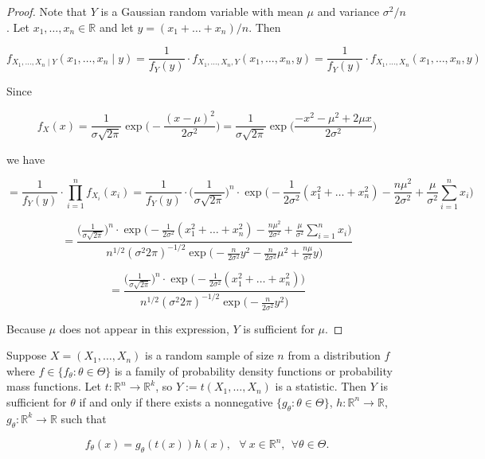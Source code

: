 \begin{proof} Note that \(Y\) is a Gaussian random variable with mean \(\mu\) and variance \(\sigma^2/n\). Let \(x_1, \ldots, x_n \in \mathbb{R}\) and let \(y = (x_1 + \ldots + x_n)/n\). Then

\[
f_{X_1, \ldots, X_n \mid Y}(x_1, \ldots, x_n \mid y) = \frac{1}{f_Y(y)} \cdot f_{X_1, \ldots , X_n, Y} (x_1, \ldots, x_n, y) = \frac{1}{f_Y(y)} \cdot f_{X_1, \ldots , X_n} (x_1, \ldots, x_n, y)
\]

Since

\[
f_X(x) = \frac{1}{\sigma \sqrt{2 \pi}} \exp \bigg(-\frac{ (x-\mu)^2}{2 \sigma^2} \bigg)  = \frac{1}{\sigma \sqrt{2 \pi}} \exp \bigg(\frac{ -x^2 - \mu^2 + 2 \mu x}{2 \sigma^2} \bigg) 
\]

we have

\[
= \frac{1}{f_Y(y)} \cdot \prod_{i=1}^n f_{X_i}(x_i) = \frac{1}{f_Y(y)} \cdot \bigg( \frac{1}{\sigma \sqrt{2 \pi}} \bigg)^n \cdot \exp \bigg( - \frac{1}{2 \sigma^2}(x_1^2 + \ldots + x_n^2) - \frac{n \mu^2}{2 \sigma^2} + \frac{\mu}{\sigma^2} \sum_{i=1}^n x_i\bigg)
\]

\[
= \frac{ \bigg( \frac{1}{\sigma \sqrt{2 \pi}} \bigg)^n \cdot \exp \bigg( - \frac{1}{2 \sigma^2}(x_1^2 + \ldots + x_n^2) - \frac{n \mu^2}{2 \sigma^2} + \frac{\mu}{\sigma^2} \sum_{i=1}^n x_i\bigg) } {n^{1/2} (\sigma^2 2 \pi)^{-1/2} \exp \bigg( - \frac{n}{2 \sigma^2} y^2 - \frac{n}{2 \sigma^2} \mu^2 + \frac{n \mu}{\sigma^2} y \bigg) }
\]

\[
= \frac{ \bigg( \frac{1}{\sigma \sqrt{2 \pi}} \bigg)^n \cdot \exp \bigg( - \frac{1}{2 \sigma^2}(x_1^2 + \ldots + x_n^2)\bigg) } {n^{1/2} (\sigma^2 2 \pi)^{-1/2} \exp \bigg( - \frac{n}{2 \sigma^2} y^2  \bigg) }
\]

Because \(\mu\) does not appear in this expression, \(Y\) is sufficient for \(\mu\).

\end{proof}

\begin{theorem}Suppose \(X = (X_1, \ldots, X_n)\) is a random sample of size \(n\) from a distribution \(f\) where \(f \in \{f_\theta: \theta \in \Theta\}\) is a family of probability density functions or probability mass functions.  Let \(t: \mathbb{R}^n \to \mathbb{R}^k\), so \(Y:= t(X_1, \ldots, X_n)\) is a statistic. Then \(Y\) is sufficient for \(\theta\) if and only if there exists a nonnegative \(\{g_\theta: \theta \in \Theta\}\), \(h: \mathbb{R}^n \to \mathbb{R}\), \(g_\theta: \mathbb{R}^k \to \mathbb{R}\) such that

\[
f_\theta(x) = g_\theta(t(x)) h(x), \ \ \ \forall \ x \in \mathbb{R}^n, \ \ \forall \theta \in \Theta.
\]


\end{theorem}


